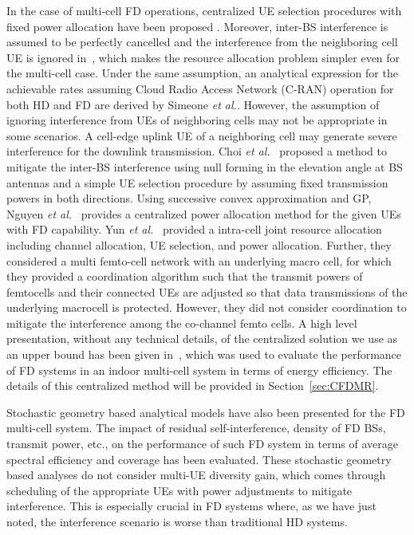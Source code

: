 \documentclass[journal]{IEEEtran}
\begin{document}
In the case of multi-cell FD operations, centralized UE selection procedures with fixed power allocation have been proposed \cite{XShen13, HyunICTC, SanjayCISS13}. Moreover, inter-BS interference is assumed to be perfectly cancelled and the interference from the neighboring cell UE is ignored in~\cite{XShen13,HyunICTC}, which makes the resource allocation problem simpler even for the multi-cell case. Under the same assumption, an analytical expression for the achievable rates assuming Cloud Radio Access Network (C-RAN) operation for both HD and FD are derived by Simeone \emph{et al.}\cite{Simeone2014full}. However, the assumption of ignoring interference from UEs of neighboring cells may not be appropriate in some scenarios. A cell-edge uplink UE of a neighboring cell may generate severe interference for the downlink transmission. Choi \emph{et al.}~\cite{ChoiSTR12} proposed a method to mitigate the inter-BS interference using null forming in the elevation angle at BS antennas and a simple UE selection procedure by assuming fixed transmission powers in both directions. Using successive convex approximation and GP, Nguyen \emph{et al.}~\cite{multi_cell_GPonly} provides a centralized power allocation method for the given UEs with FD capability. Yun \emph{et al.}~\cite{multi_cell_yun} provided a intra-cell joint resource allocation including channel allocation, UE selection, and power allocation. Further, they considered a multi femto-cell network with an underlying macro cell, for which they provided a coordination algorithm such that the transmit powers of femtocells and their connected UEs are adjusted so that data transmissions of the underlying macrocell is protected. However, they did not consider coordination to mitigate the interference among the co-channel femto cells. A high level presentation, without any technical details, of the centralized solution we use as an upper bound has been given in~\cite{Goyal_CommMag}, which was used to evaluate the performance of FD systems in an indoor multi-cell system in terms of energy efficiency. The details of this centralized method will be provided in Section~\ref{sec:CFDMR}.

Stochastic geometry based analytical models have also been presented \cite{SanjayCISS13}\cite{alves2014average, Quekhybrid, Goyal_ICC16} for the FD multi-cell system. The impact of residual self-interference, density of FD BSs, transmit power, etc., on the performance of such FD system in terms of average spectral efficiency and coverage has been evaluated. These stochastic geometry based analyses do not consider multi-UE diversity gain, which comes through scheduling of the appropriate UEs with power adjustments to mitigate interference. This is especially crucial in FD systems where, as we have just noted, the interference scenario is worse than traditional HD systems.
\end{document}
